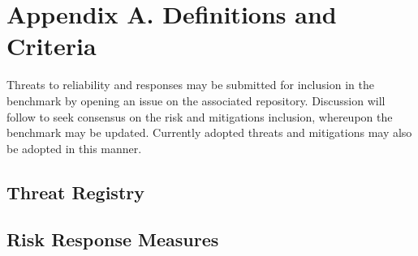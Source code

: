 \section{Appendix A. Definitions and Criteria}
Threats to reliability and responses may be submitted for inclusion in the benchmark by opening an issue on the associated repository. Discussion will follow to seek consensus on the risk and mitigations inclusion, whereupon the benchmark may be updated. Currently adopted threats and mitigations may also be adopted in this manner.

\subsection{Threat Registry}


\subsection{Risk Response Measures}

